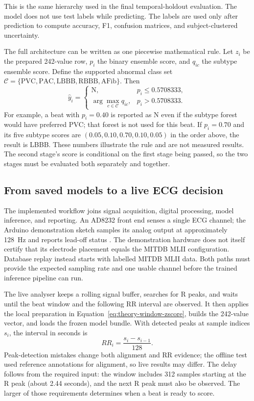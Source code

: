 This is the same hierarchy used in the final temporal-holdout evaluation. The
model does not use test labels while predicting. The labels are used only after
prediction to compute accuracy, F1, confusion matrices, and subject-clustered
uncertainty.

The full architecture can be written as one piecewise mathematical rule. Let
$z_i$ be the prepared 242-value row, $p_i$ the binary ensemble score, and
$q_{ic}$ the subtype ensemble score. Define the supported abnormal class set
$\mathcal{C}=\{\mathrm{PVC},\mathrm{PAC},\mathrm{LBBB},\mathrm{RBBB},
\mathrm{AFib}\}$. Then
\begin{equation}
 \widehat y_i=
 \begin{cases}
 \mathrm{N}, & p_i\leq0.5708333,\\[2pt]
 \displaystyle\arg\max_{c\in\mathcal{C}}q_{ic},
 & p_i>0.5708333.
 \end{cases}
 \label{eq:method-complete-decision}
\end{equation}
For example, a beat with $p_i=0.40$ is reported as N even if the subtype
forest would have preferred PVC; that forest is not used for this beat. If
$p_i=0.70$ and its five subtype scores are
$(0.05,0.10,0.70,0.10,0.05)$ in the order above, the result is LBBB.
These numbers illustrate the rule and are not measured results. The second
stage's score is conditional on the first stage being passed, so the two
stages must be evaluated both separately and together.

\subsection{From saved models to a live ECG decision}

The implemented workflow joins signal acquisition, digital processing, model
inference, and reporting. An AD8232 front end senses a single ECG channel;
the Arduino demonstration sketch samples its analog output at approximately
128~Hz and reports lead-off status \cite{ad8232}. The demonstration hardware
does not itself certify that its electrode placement equals the MITDB MLII
configuration. Database replay instead starts with labelled MITDB MLII data.
Both paths must provide the expected sampling rate and one usable channel
before the trained inference pipeline can run.

The live analyser keeps a rolling signal buffer, searches for R peaks, and
waits until the beat window and the following RR interval are observed. It
then applies the local preparation in Equation~\ref{eq:theory-window-zscore},
builds the 242-value vector, and loads the frozen model bundle. With detected
peaks at sample indices $s_i$, the interval in seconds is
\begin{equation}
 RR_i=\frac{s_i-s_{i-1}}{128}.
\end{equation}
Peak-detection mistakes change both alignment and RR evidence; the offline
test used reference annotations for alignment, so live results may differ.
The delay follows from the required input: the window includes 312 samples
starting at the R peak (about 2.44 seconds), and the next R peak must also
be observed.
The larger of those requirements determines when a beat is ready to score.

